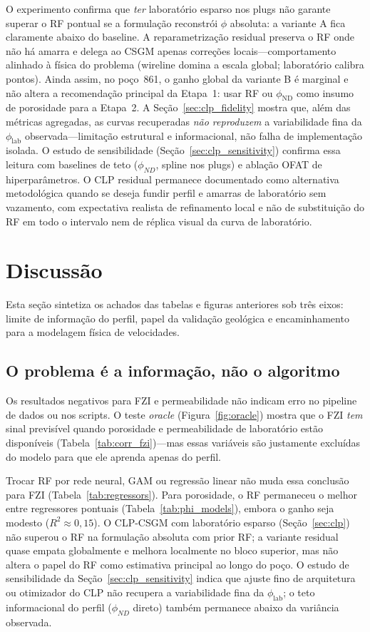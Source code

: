 \documentclass[11pt,a4paper]{article}
\newcommand{\philab}{\ensuremath{\phi_{\mathrm{lab}}}}
\newcommand{\phiND}{\ensuremath{\phi_{\mathrm{ND}}}}
\begin{document}
O experimento confirma que \emph{ter} laboratório esparso nos plugs não
garante superar o RF pontual se a formulação reconstrói $\phi$ absoluta:
a variante A fica claramente abaixo do baseline.
A reparametrização residual preserva o RF onde não há amarra e delega ao
CSGM apenas correções locais---comportamento alinhado à física do
problema (wireline domina a escala global; laboratório calibra pontos).
Ainda assim, no poço~861, o ganho global da variante B é marginal e não
altera a recomendação principal da Etapa~1: usar RF ou \phiND{} como
insumo de porosidade para a Etapa~2.
A Seção~\ref{sec:clp_fidelity} mostra que, além das métricas agregadas,
as curvas recuperadas \emph{não reproduzem} a variabilidade fina da
\philab{} observada---limitação estrutural e informacional, não falha de
implementação isolada.
O estudo de sensibilidade (Seção~\ref{sec:clp_sensitivity}) confirma essa
leitura com baselines de teto ($\phi_{ND}$, spline nos plugs) e ablação
OFAT de hiperparâmetros.
O CLP residual permanece documentado como alternativa metodológica quando
se deseja fundir perfil e amarras de laboratório sem vazamento, com
expectativa realista de refinamento local e não de substituição do RF em
todo o intervalo nem de réplica visual da curva de laboratório.

\section{Discussão}
\label{sec:discussao}

Esta seção sintetiza os achados das tabelas e figuras anteriores
sob três eixos: limite de informação do perfil, papel da validação
geológica e encaminhamento para a modelagem física de velocidades.

\subsection{O problema é a informação, não o algoritmo}

Os resultados negativos para FZI e permeabilidade não indicam erro no
pipeline de dados ou nos scripts.
O teste \emph{oracle} (Figura~\ref{fig:oracle}) mostra que o FZI \emph{tem}
sinal previsível quando porosidade e permeabilidade de laboratório
estão disponíveis (Tabela~\ref{tab:corr_fzi})---mas essas variáveis
são justamente excluídas do modelo para que ele aprenda apenas do perfil.

Trocar RF por rede neural, GAM ou regressão linear não muda essa
conclusão para FZI (Tabela~\ref{tab:regressors}).
Para porosidade, o RF permaneceu o melhor entre regressores pontuais
(Tabela~\ref{tab:phi_models}), embora o ganho seja modesto ($R^2 \approx
0{,}15$).
O CLP-CSGM com laboratório esparso (Seção~\ref{sec:clp}) não superou o
RF na formulação absoluta com prior RF; a variante residual quase empata
globalmente e melhora localmente no bloco superior, mas não altera o
papel do RF como estimativa principal ao longo do poço.
O estudo de sensibilidade da Seção~\ref{sec:clp_sensitivity} indica que
ajuste fino de arquitetura ou otimizador do CLP não recupera a
variabilidade fina da \philab{}; o teto informacional do perfil
($\phi_{ND}$ direto) também permanece abaixo da variância observada.
\end{document}
